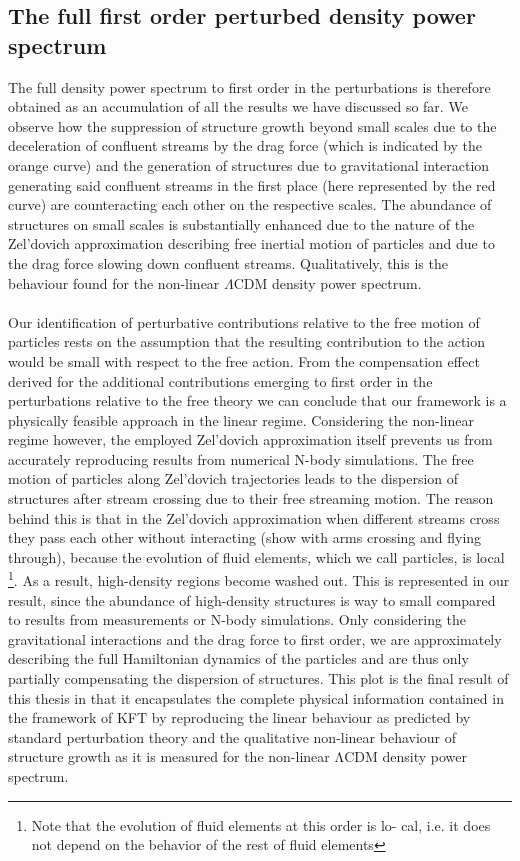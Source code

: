 \subsection{The full first order perturbed density power spectrum}
The full density power spectrum to first order in the perturbations is therefore obtained as an accumulation of all the results we have discussed so far.
We observe how the suppression of structure growth beyond small scales due to the deceleration of confluent streams by the drag force (which is indicated by the orange curve) and the generation of structures due to gravitational interaction generating said confluent streams in the first place (here represented by the red curve) are counteracting each other on the respective scales.
The abundance of structures on small scales is substantially enhanced due to the nature of the Zel’dovich approximation describing free inertial motion of particles and due to the drag force slowing down confluent streams. Qualitatively, this is the behaviour found for the non-linear $\Lambda$CDM density power spectrum.\\
\\
Our identification of perturbative contributions relative to the free motion of particles rests on the
assumption that the resulting contribution to the action would be small with respect to
the free action. From the compensation effect derived for the additional contributions emerging to first order in the perturbations relative to the free theory we can conclude that our framework is a physically feasible approach in the linear regime. Considering the non-linear regime however, the employed
Zel’dovich approximation itself prevents us from accurately reproducing results from
numerical N-body simulations. The free motion of particles along Zel’dovich trajectories leads to the dispersion of structures after stream crossing due to their free streaming motion. The reason behind this is that in the Zel'dovich approximation when different streams cross they pass each other without interacting (show with arms crossing and flying through),
because the evolution of fluid elements, which we call particles, is local \footnote{Note that the evolution of fluid elements at this order is lo-
	cal, i.e. it does not depend on the behavior of the rest of fluid elements}. As a result, high-density regions become washed
out. This is represented in our result, since the abundance of high-density structures is way to small compared to results from measurements or N-body simulations. 
Only considering the gravitational interactions and the drag force to first order, we are
approximately describing the full Hamiltonian dynamics of the particles and are thus
only partially compensating the dispersion of structures.
This plot is the final result of this thesis in that it encapsulates the complete physical
information contained in the framework of KFT by reproducing the linear behaviour as
predicted by standard perturbation theory and the qualitative non-linear behaviour of
structure growth as it is measured for the non-linear ΛCDM density power spectrum.
